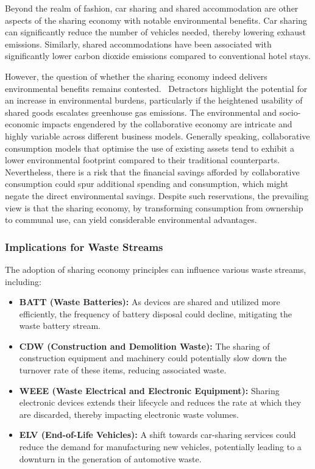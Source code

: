 Beyond the realm of fashion, car sharing and shared accommodation are other
aspects of the sharing economy with notable environmental benefits. Car sharing
can significantly reduce the number of vehicles needed, thereby lowering
exhaust emissions. Similarly, shared accommodations have been associated with
significantly lower carbon dioxide emissions compared to conventional hotel
stays.

However, the question of whether the sharing economy indeed delivers
environmental benefits remains contested.~\cite{zhu2021sharing,
  geissinger2019sharing} Detractors highlight the potential for an increase in
environmental burdens, particularly if the heightened usability of shared goods
escalates greenhouse gas emissions. The environmental and socio-economic
impacts engendered by the collaborative economy are intricate and highly
variable across different business models. Generally speaking, collaborative
consumption models that optimise the use of existing assets tend to exhibit a
lower environmental footprint compared to their traditional counterparts.
Nevertheless, there is a risk that the financial savings afforded by
collaborative consumption could spur additional spending and consumption, which
might negate the direct environmental savings. Despite such reservations, the
prevailing view is that the sharing economy, by transforming consumption from
ownership to communal use, can yield considerable environmental advantages.

\subsubsection{Implications for Waste Streams}

The adoption of sharing economy principles can influence various waste streams,
including:

\begin{itemize}
  \item \textbf{BATT (Waste Batteries):} As devices are shared and utilized more efficiently, the frequency of battery disposal could decline, mitigating the waste battery stream.
  \item \textbf{CDW (Construction and Demolition Waste):} The sharing of construction equipment and machinery could potentially slow down the turnover rate of these items, reducing associated waste.
  \item \textbf{WEEE (Waste Electrical and Electronic Equipment):} Sharing electronic devices extends their lifecycle and reduces the rate at which they are discarded, thereby impacting electronic waste volumes.
  \item \textbf{ELV (End-of-Life Vehicles):} A shift towards car-sharing services could reduce the demand for manufacturing new vehicles, potentially leading to a downturn in the generation of automotive waste.
\end{itemize}

